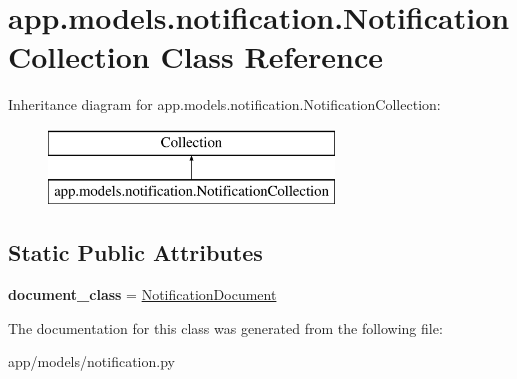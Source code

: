\hypertarget{classapp_1_1models_1_1notification_1_1_notification_collection}{}\section{app.\+models.\+notification.\+Notification\+Collection Class Reference}
\label{classapp_1_1models_1_1notification_1_1_notification_collection}
Inheritance diagram for app.\+models.\+notification.\+Notification\+Collection\+:\begin{figure}[H]
\begin{center}
\leavevmode
\includegraphics[height=2.000000cm]{classapp_1_1models_1_1notification_1_1_notification_collection}
\end{center}
\end{figure}
\subsection*{Static Public Attributes}
\begin{DoxyCompactItemize}
\item 
\mbox{\label{classapp_1_1models_1_1notification_1_1_notification_collection_a2e930be16705cb797cf647315ec0b646}} 
{\bfseries document\+\_\+class} = \hyperlink{classapp_1_1models_1_1notification_1_1_notification_document}{Notification\+Document}
\end{DoxyCompactItemize}


The documentation for this class was generated from the following file\+:\begin{DoxyCompactItemize}
\item 
app/models/notification.\+py\end{DoxyCompactItemize}
